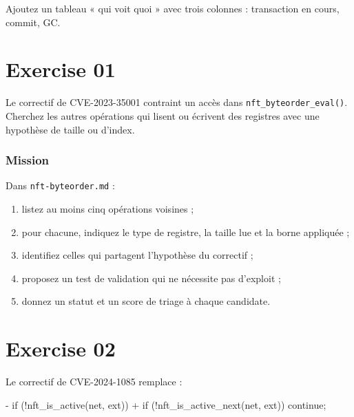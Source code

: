 \documentclass{training}
\begin{document}
Ajoutez un tableau « qui voit quoi » avec trois colonnes : transaction en
cours, commit, GC.


\chapter{Exercise 01}
\makeheaderfiles

Le correctif de CVE-2023-35001 contraint un accès dans
\texttt{nft\_byteorder\_eval()}. Cherchez les autres opérations qui lisent
ou écrivent des registres avec une hypothèse de taille ou d'index.

\subsection*{Mission}

Dans \texttt{nft-byteorder.md} :

\begin{enumerate}
  \item listez au moins cinq opérations voisines ;
  \item pour chacune, indiquez le type de registre, la taille lue et la
        borne appliquée ;
  \item identifiez celles qui partagent l'hypothèse du correctif ;
  \item proposez un test de validation qui ne nécessite pas d'exploit ;
  \item donnez un statut et un score de triage à chaque candidate.
\end{enumerate}

\chapter{Exercise 02}
\makeheaderfiles

Le correctif de CVE-2024-1085 remplace :

\begin{console}
- if (!nft_is_active(net, ext))
+ if (!nft_is_active_next(net, ext))
      continue;
\end{console}
\end{document}
